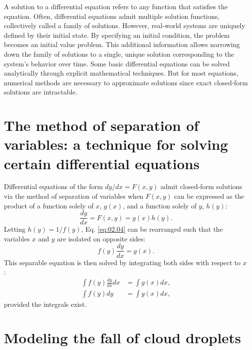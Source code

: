 A solution to a differential equation refers to any function that satisfies the equation. Often, differential equations admit multiple solution functions, collectively called a family of solutions. However, real-world systems are uniquely defined by their initial state. By specifying an initial condition, the problem becomes an initial value problem. This additional information allows narrowing down the family of solutions to a single, unique solution corresponding to the system's behavior over time. Some basic differential equations can be solved analytically through explicit mathematical techniques. But for most equations, numerical methods are necessary to approximate solutions since exact closed-form solutions are intractable.

\section{The method of separation of variables: a technique for solving certain differential equations}

Differential equations of the form $dy/dx = F(x,y)$ admit closed-form solutions via the method of separation of variables when $F(x,y)$ can be expressed as the product of a function solely of $x$, $g(x)$, and a function solely of $y$, $h(y)$:
\begin{equation}
\frac{dy}{dx} = F(x,y) = g(x)h(y). \label{eq:02.04}
\end{equation}
Letting $h(y)=1/f(y)$, Eq. \eqref{eq:02.04} can be rearranged such that the variables $x$ and $y$ are isolated on opposite sides:
\begin{equation*}
f(y)\frac{dy}{dx} = g(x).
\end{equation*}
This separable equation is then solved by integrating both sides with respect to $x$:
\begin{align*}
\int f(y)\frac{dy}{dx} dx & =  \int g(x) dx, \\
\int f(y) dy & =  \int g(x) dx,
\end{align*}
provided the integrals exist.

\section{Modeling the fall of cloud droplets}


